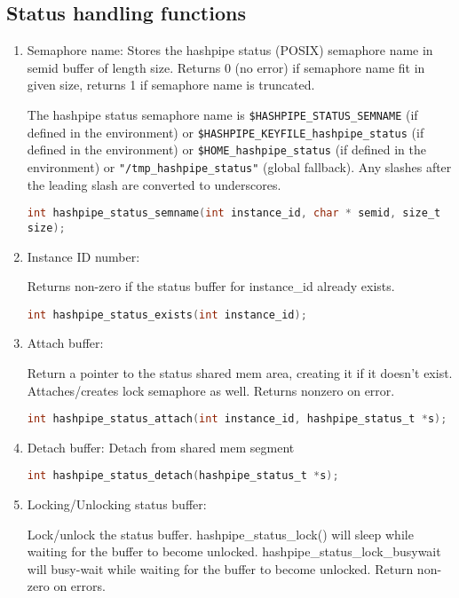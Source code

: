 \documentclass[12pt]{article}
\def\clst{\lstinline[basicstyle=\ttfamily,breaklines=true,language=C]}
\begin{document}
\subsection*{Status handling functions}
\begin{enumerate}

\item Semaphore name:
Stores the hashpipe status (POSIX) semaphore name in semid buffer of length
size.  Returns 0 (no error) if semaphore name fit in given size, returns 1
if semaphore name is truncated.

The hashpipe status semaphore name is {\tt \$HASHPIPE\_STATUS\_SEMNAME} (if defined
in the environment) or {\tt \${HASHPIPE\_KEYFILE}\_hashpipe\_status} (if defined in
the environment) or {\tt \${HOME}\_hashpipe\_status} (if defined in the environment)
or {\tt "/tmp\_hashpipe\_status"} (global fallback).  Any slashes after the leading
slash are converted to underscores.

\clst{int hashpipe_status_semname(int instance_id, char * semid, size_t size); }

\item Instance ID number:

Returns non-zero if the status buffer for instance\_id already exists.

\clst{int hashpipe_status_exists(int instance_id);}

\item Attach buffer:

Return a pointer to the status shared mem area,
creating it if it doesn't exist.  Attaches/creates
lock semaphore as well.  Returns nonzero on error.

\clst{int hashpipe_status_attach(int instance_id, hashpipe_status_t *s); }


\item Detach buffer: Detach from shared mem segment

\clst{int hashpipe_status_detach(hashpipe_status_t *s);}

\item Locking/Unlocking status buffer:

Lock/unlock the status buffer.  hashpipe\_status\_lock() will sleep while
waiting for the buffer to become unlocked.  hashpipe\_status\_lock\_busywait
will busy-wait while waiting for the buffer to become unlocked.  Return
non-zero on errors.

\begin{centering}
\begin{lstlisting}


\end{lstlisting}
\end{centering}
\end{enumerate}
\end{document}
